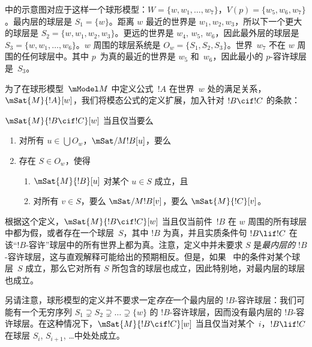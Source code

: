 \documentclass[../../../include/open-logic-section]{subfiles}
\begin{document}
 中的示意图对应于这样一个球形模型：$W = \{w, w_1, \dots, w_7\}$，$V(p) = \{w_5, w_6,
w_7\}$。最内层的球层是 $S_1 = \{w\}$。距离 $w$ 最近的世界是 $w_1, w_2, w_3$，所以下一个更大的球层是 $S_2 = \{w, w_1,
w_2, w_3\}$。更远的世界是 $w_4$, $w_5$, $w_6$，因此最外层的球层是 $S_3 = \{w, w_1, \dots, w_6\}$。$w$ 周围的球层系统是 $O_w = \{S_1, S_2, S_3\}$。世界~$w_7$ 不在 $w$ 周围的任何球层中。其中 $p$~为真的最近的世界是 $w_5$ 和~$w_6$，因此最小的 $p$-\allowbreak 容许球层是~$S_3$。

为了在球形模型~$\mModel M$ 中定义公式~$!A$ 在世界~$w$ 处的满足关系，$\mSat{M}{!A}[w]$，我们将模态公式的定义扩展，加入针对 $!B \cif !C$ 的条款：

\begin{defn}
  $\mSat{M}{!B \cif !C}[w]$ 当且仅当要么
  \begin{enumerate}
  \item{} 对所有 $u \in \bigcup O_w$，$\mSat/{M}{!B}[u]$，要么
  \item{} 存在 $S \in O_w$，使得
    \begin{enumerate}
      \item $\mSat{M}{!B}[u]$ 对某个 $u \in S$ 成立，且
      \item 对所有 $v \in S$，要么 $\mSat/{M}{!B}[v]$，要么 $\mSat{M}{!C}[v]$。
    \end{enumerate}
  \end{enumerate}
\end{defn}

根据这个定义，$\mSat{M}{!B \cif !C}[w]$ 当且仅当前件~$!B$ 在 $w$ 周围的所有球层中都为假，或者存在一个球层~$S$，其中 $!B$ 为真，并且实质条件句 $!B \lif !C$ 在该“$!B$-\allowbreak 容许”球层中的所有世界上都为真。注意，定义中并未要求 $S$ 是\emph{最内层的} $!B$-\allowbreak 容许球层，这与直观解释可能给出的预期相反。但是，如果~ 中的条件对某个球层~$S$ 成立，那么它对所有 $S$ 所包含的球层也成立，因此特别地，对最内层的球层也成立。

另请注意，球形模型的定义并不要求一定\emph{存在}一个最内层的 $!B$-\allowbreak 容许球层：我们可能有一个无穷序列 $S_1 \supsetneq S_2 \supsetneq \dots \supsetneq
\{w\}$ 的 $!B$-\allowbreak 容许球层，因而没有最内层的 $!B$-\allowbreak 容许球层。在这种情况下，$\mSat{M}{!B \cif !C}[w]$ 当且仅当对某个~$i$，$!B \lif !C$ 在球层 $S_i$, $S_{i+1}$, \dots 中处处成立。
\end{document}
